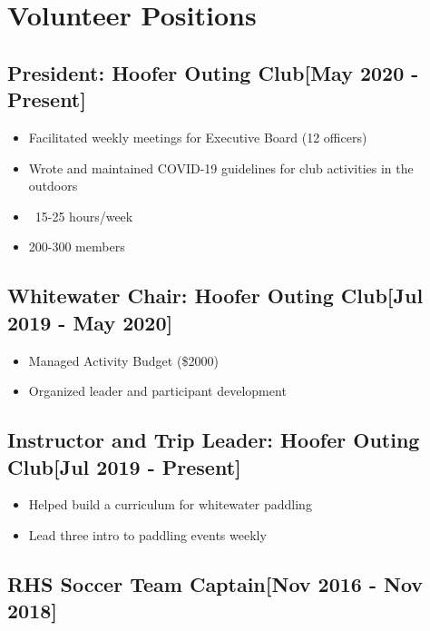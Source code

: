 \documentclass{article}
\begin{document}

\section{Volunteer Positions}

    \subsection{\textbf{President}: Hoofer Outing Club\hfill[May 2020 - Present]}
        \begin{itemize}
            \item Facilitated weekly meetings for Executive Board (12 officers)
            \item Wrote and maintained COVID-19 guidelines for club activities in the outdoors
            \item ~15-25 hours/week
            \item 200-300 members
        \end{itemize}

    \subsection{\textbf{Whitewater Chair}: Hoofer Outing Club\hfill[Jul 2019 - May 2020]}
        \begin{itemize}
            \item Managed Activity Budget (\$2000)
            \item Organized leader and participant development
        \end{itemize}

    \subsection{\textbf{Instructor and Trip Leader}: Hoofer Outing Club\hfill[Jul 2019 - Present]}
        \begin{itemize}
            \item Helped build a curriculum for whitewater paddling
            \item Lead three intro to paddling events weekly
        \end{itemize}

    \subsection{\textbf{RHS Soccer Team Captain}\hfill[Nov 2016 - Nov 2018]}
    
\end{document}
